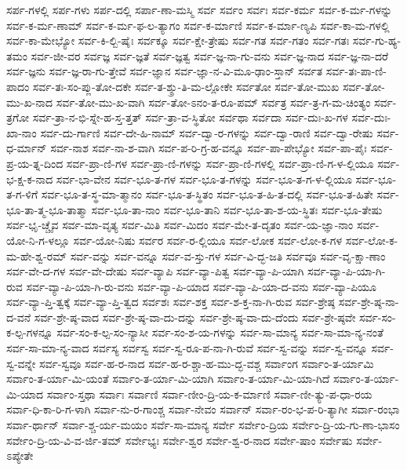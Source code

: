 {ಸರ್ಪ-ಗಳಲ್ಲಿ
ಸರ್ಪ-ಗಳು
ಸರ್ಪ-ದಲ್ಲಿ
ಸರ್ಪಾ-ಣಾ-ಮಸ್ಮಿ
ಸರ್ವ
ಸರ್ವಂ
ಸರ್ವಃ
ಸರ್ವ-ಕರ್ಮ
ಸರ್ವ-ಕ-ರ್ಮ-ಗಳನ್ನು
ಸರ್ವ-ಕ-ರ್ಮ-ಣಾಮ್
ಸರ್ವ-ಕ-ರ್ಮ-ಫ-ಲ-ತ್ಯಾಗಂ
ಸರ್ವ-ಕ-ರ್ಮಾಣಿ
ಸರ್ವ-ಕ-ರ್ಮಾ-ಣ್ಯಪಿ
ಸರ್ವ-ಕಾ-ಮ-ಗಳಲ್ಲಿ
ಸರ್ವ-ಕಾ-ಮೇಭ್ಯೋ
ಸರ್ವ-ಕಿ-ಲ್ಬಿ-ಷೈಃ
ಸರ್ವಕ್ಕೂ
ಸರ್ವ-ಕ್ಷೇ-ತ್ರೇಷು
ಸರ್ವ-ಗತ
ಸರ್ವ-ಗತಂ
ಸರ್ವ-ಗತಃ
ಸರ್ವ-ಗು-ಹ್ಯ-ತಮಂ
ಸರ್ವ-ಜೀ-ವರ
ಸರ್ವಜ್ಞ
ಸರ್ವ-ಜ್ಞತೆ
ಸರ್ವ-ಜ್ಞತ್ವ
ಸರ್ವ-ಜ್ಞ-ನಾ-ಗು-ವನು
ಸರ್ವ-ಜ್ಞ-ನಾದ
ಸರ್ವ-ಜ್ಞ-ನಾ-ದರೆ
ಸರ್ವ-ಜ್ಞನು
ಸರ್ವ-ಜ್ಞ-ರಾ-ಗು-ತ್ತೇವೆ
ಸರ್ವ-ಜ್ಞಾನ
ಸರ್ವ-ಜ್ಞಾ-ನ-ವಿ-ಮೂ-ಢಾಂ-ಸ್ತಾನ್
ಸರ್ವತ
ಸರ್ವ-ತಃ-ಪಾ-ಣಿ-ಪಾದಂ
ಸರ್ವ-ತಃ-ಸಂ-ಪ್ಲು-ತೋ-ದಕೇ
ಸರ್ವ-ತ-ಶ್ಶ್ರು-ತಿ-ಮ-ಲ್ಲೋಕೇ
ಸರ್ವತೋ
ಸರ್ವ-ತೋ-ಮುಖ
ಸರ್ವ-ತೋ-ಮು-ಖ-ನಾದ
ಸರ್ವ-ತೋ-ಮು-ಖ-ವಾಗಿ
ಸರ್ವ-ತೋ-ಽನಂ-ತ-ರೂ-ಪಮ್
ಸರ್ವತ್ರ
ಸರ್ವ-ತ್ರ-ಗ-ಮ-ಚಿಂತ್ಯಂ
ಸರ್ವ-ತ್ರಗೋ
ಸರ್ವ-ತ್ರಾ-ನ-ಭಿ-ಸ್ನೇ-ಹ-ಸ್ತ-ತ್ತತ್
ಸರ್ವ-ತ್ರಾ-ವ-ಸ್ಥಿತೋ
ಸರ್ವಥಾ
ಸರ್ವದಾ
ಸರ್ವ-ದುಃ-ಖ-ಗಳ
ಸರ್ವ-ದುಃ-ಖಾ-ನಾಂ
ಸರ್ವ-ದು-ರ್ಗಾಣಿ
ಸರ್ವ-ದೇ-ಹಿ-ನಾಮ್
ಸರ್ವ-ದ್ವಾ-ರ-ಗಳನ್ನು
ಸರ್ವ-ದ್ವಾ-ರಾಣಿ
ಸರ್ವ-ದ್ವಾ-ರೇಷು
ಸರ್ವ-ಧ-ರ್ಮಾನ್
ಸರ್ವ-ನಾಶ
ಸರ್ವ-ನಾ-ಶ-ವಾಗಿ
ಸರ್ವ-ಪ-ರಿ-ಗ್ರ-ಹ-ವನ್ನೂ
ಸರ್ವ-ಪಾ-ಪೇಭ್ಯೋ
ಸರ್ವ-ಪಾ-ಪೈಃ
ಸರ್ವ-ಪ್ರ-ಯ-ತ್ನ-ದಿಂದ
ಸರ್ವ-ಪ್ರಾ-ಣಿ-ಗಳ
ಸರ್ವ-ಪ್ರಾ-ಣಿ-ಗಳನ್ನು
ಸರ್ವ-ಪ್ರಾ-ಣಿ-ಗಳಲ್ಲಿ
ಸರ್ವ-ಪ್ರಾ-ಣಿ-ಗ-ಳ-ಲ್ಲಿಯೂ
ಸರ್ವ-ಭ-ಕ್ಷ-ಕ-ನಾದ
ಸರ್ವ-ಭಾ-ವೇನ
ಸರ್ವ-ಭೂ-ತ-ಗಳ
ಸರ್ವ-ಭೂ-ತ-ಗಳನ್ನು
ಸರ್ವ-ಭೂ-ತ-ಗ-ಳ-ಲ್ಲಿಯೂ
ಸರ್ವ-ಭೂ-ತ-ಗ-ಳಿಗೆ
ಸರ್ವ-ಭೂ-ತ-ಸ್ಥ-ಮಾ-ತ್ಮಾನಂ
ಸರ್ವ-ಭೂ-ತ-ಸ್ಥಿತಂ
ಸರ್ವ-ಭೂ-ತ-ಹಿ-ತ-ದಲ್ಲಿ
ಸರ್ವ-ಭೂ-ತ-ಹಿತೇ
ಸರ್ವ-ಭೂ-ತಾ-ತ್ಮ-ಭೂ-ತಾತ್ಮಾ
ಸರ್ವ-ಭೂ-ತಾ-ನಾಂ
ಸರ್ವ-ಭೂ-ತಾನಿ
ಸರ್ವ-ಭೂ-ತಾ-ಶ-ಯ-ಸ್ಥಿತಃ
ಸರ್ವ-ಭೂ-ತೇಷು
ಸರ್ವ-ಭೃ-ಚ್ಚೈವ
ಸರ್ವ-ಮಾ-ವೃತ್ಯ
ಸರ್ವ-ಮಿತಿ
ಸರ್ವ-ಮಿದಂ
ಸರ್ವ-ಮೇ-ತ-ದೃತಂ
ಸರ್ವ-ಯ-ಜ್ಞಾ-ನಾಂ
ಸರ್ವ-ಯೋ-ನಿ-ಗ-ಳಲ್ಲೂ
ಸರ್ವ-ಯೋ-ನಿಷು
ಸರ್ವರ
ಸರ್ವ-ರ-ಲ್ಲಿಯೂ
ಸರ್ವ-ಲೋಕ
ಸರ್ವ-ಲೋ-ಕ-ಗಳ
ಸರ್ವ-ಲೋ-ಕ-ಮ-ಹೇ-ಶ್ವ-ರಮ್
ಸರ್ವ-ವನ್ನು
ಸರ್ವ-ವನ್ನೂ
ಸರ್ವ-ವ-ಸ್ತು-ಗಳ
ಸರ್ವ-ವಿ-ದ್ಭ-ಜತಿ
ಸರ್ವವೂ
ಸರ್ವ-ವೃ-ಕ್ಷಾ-ಣಾಂ
ಸರ್ವ-ವೇ-ದ-ಗಳ
ಸರ್ವ-ವೇ-ದೇಷು
ಸರ್ವ-ವ್ಯಾಪಿ
ಸರ್ವ-ವ್ಯಾ-ಪಿತ್ವ
ಸರ್ವ-ವ್ಯಾ-ಪಿ-ಯಾಗಿ
ಸರ್ವ-ವ್ಯಾ-ಪಿ-ಯಾ-ಗಿ-ರುವ
ಸರ್ವ-ವ್ಯಾ-ಪಿ-ಯಾ-ಗಿ-ರು-ವನು
ಸರ್ವ-ವ್ಯಾ-ಪಿ-ಯಾದ
ಸರ್ವ-ವ್ಯಾ-ಪಿ-ಯಾ-ದ-ವನು
ಸರ್ವ-ವ್ಯಾ-ಪಿಯೂ
ಸರ್ವ-ವ್ಯಾ-ಪ್ತಿ-ತ್ವಕ್ಕೆ
ಸರ್ವ-ವ್ಯಾ-ಪ್ತಿ-ತ್ವದ
ಸರ್ವಶಃ
ಸರ್ವ-ಶಕ್ತ
ಸರ್ವ-ಶ-ಕ್ತ-ನಾ-ಗಿ-ರುವ
ಸರ್ವ-ಶ್ರೇಷ್ಠ
ಸರ್ವ-ಶ್ರೇ-ಷ್ಠ-ನಾ-ದ-ವನೆ
ಸರ್ವ-ಶ್ರೇ-ಷ್ಠ-ವಾದ
ಸರ್ವ-ಶ್ರೇ-ಷ್ಠ-ವಾ-ದು-ದನ್ನು
ಸರ್ವ-ಶ್ರೇ-ಷ್ಠ-ವಾ-ದು-ದೆಂದು
ಸರ್ವ-ಶ್ರೇ-ಷ್ಠವೇ
ಸರ್ವ-ಸಂ-ಕ-ಲ್ಪ-ಗಳನ್ನೂ
ಸರ್ವ-ಸಂ-ಕ-ಲ್ಪ-ಸಂ-ನ್ಯಾಸೀ
ಸರ್ವ-ಸಂ-ಶ-ಯ-ಗಳನ್ನು
ಸರ್ವ-ಸಾ-ಮಾನ್ಯ
ಸರ್ವ-ಸಾ-ಮಾ-ನ್ಯ-ನಂತೆ
ಸರ್ವ-ಸಾ-ಮಾ-ನ್ಯ-ವಾದ
ಸರ್ವಸ್ಯ
ಸರ್ವಸ್ವ
ಸರ್ವ-ಸ್ವ-ರೂ-ಪ-ನಾ-ಗಿ-ರುವೆ
ಸರ್ವ-ಸ್ವ-ವನ್ನು
ಸರ್ವ-ಸ್ವ-ವನ್ನೂ
ಸರ್ವ-ಸ್ವ-ವನ್ನೇ
ಸರ್ವ-ಸ್ವವೂ
ಸರ್ವ-ಹ-ರ-ನಾದ
ಸರ್ವ-ಹ-ರ-ಶ್ಚಾ-ಹ-ಮು-ದ್ಭ-ವಶ್ಚ
ಸರ್ವಾಂಗ
ಸರ್ವಾಂ-ತ-ರ್ಯಾಮಿ
ಸರ್ವಾಂ-ತ-ರ್ಯಾ-ಮಿ-ಯಂತೆ
ಸರ್ವಾಂ-ತ-ರ್ಯಾ-ಮಿ-ಯಾಗಿ
ಸರ್ವಾಂ-ತ-ರ್ಯಾ-ಮಿ-ಯಾ-ಗಿದೆ
ಸರ್ವಾಂ-ತ-ರ್ಯಾ-ಮಿ-ಯಾದ
ಸರ್ವಾಂ-ಸ್ತಥಾ
ಸರ್ವಾಃ
ಸರ್ವಾಣಿ
ಸರ್ವಾ-ಣೀಂ-ದ್ರಿ-ಯ-ಕ-ರ್ಮಾಣಿ
ಸರ್ವಾ-ಣೀ-ತ್ಯು-ಪ-ಧಾ-ರಯ
ಸರ್ವಾ-ಧಿ-ಕಾ-ರಿ-ಗ-ಳಾಗಿ
ಸರ್ವಾ-ನು-ರ-ಗಾಂಶ್ಚ
ಸರ್ವಾ-ನೇವಂ
ಸರ್ವಾನ್
ಸರ್ವಾ-ರಂ-ಭ-ಪ-ರಿ-ತ್ಯಾಗೀ
ಸರ್ವಾ-ರಂಭಾ
ಸರ್ವಾ-ರ್ಥಾನ್
ಸರ್ವಾ-ಶ್ಚ-ರ್ಯ-ಮಯಂ
ಸರ್ವೆ-ಸಾ-ಮಾನ್ಯ
ಸರ್ವೇ
ಸರ್ವೇಂ-ದ್ರಿಯ
ಸರ್ವೇಂ-ದ್ರಿ-ಯ-ಗು-ಣಾ-ಭಾಸಂ
ಸರ್ವೇಂ-ದ್ರಿ-ಯ-ವಿ-ವ-ರ್ಜಿ-ತಮ್
ಸರ್ವೇಭ್ಯಃ
ಸರ್ವೇ-ಶ್ವರ
ಸರ್ವೇ-ಶ್ವ-ರ-ನಾದ
ಸರ್ವೇ-ಷಾಂ
ಸರ್ವೇಷು
ಸರ್ವೇ-ಽಪ್ಯೇತೇ
}
